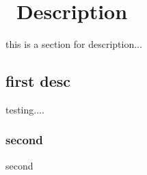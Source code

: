 \chapter [Description]{\ Description}
\label{chap:Discussion}
this is a section for description...
\section{first desc}
testing....
\subsection{second}
second